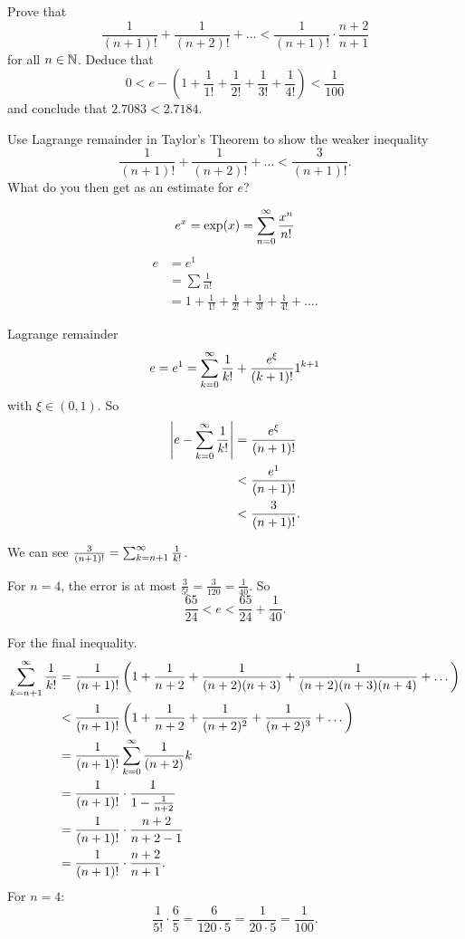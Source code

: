 \documentclass[10pt, a4paper]{article}
\begin{document}
\begin{problem}[6]
    Prove that
    \[
    \frac{1}{(n + 1)!} + \frac{1}{(n + 2)!} + \dotsc < \frac{1}{(n + 1)!}\cdot\frac{n + 2}{n + 1}
    \]
    for all $n \in \N$.
    Deduce that
    \[
    0 < e - \left(1 + \frac{1}{1!} + \frac{1}{2!} + \frac{1}{3!} + \frac{1}{4!}\right) < \frac{1}{100}
    \]
    and conclude that $2.7083 < 2.7184$.

    Use Lagrange remainder in Taylor's Theorem to show the weaker inequality
    \[
    \frac{1}{(n + 1)!} + \frac{1}{(n + 2)!} + \dotsc < \frac{3}{(n + 1)!}.
    \]
    What do you then get as an estimate for $e$?

    \begin{solution}
        \[
        e ^ x = \exp(x) = \infsum[n = 0]\frac{x ^ n}{n!}
        \]
        \begin{align*}
            e &= e ^ 1 \\
            &= \sum\frac{1}{n!} \\
            &= 1 + \frac{1}{1!} + \frac{1}{2!} + \frac{1}{3!} + \frac{1}{4!} + \dotsc.
        \end{align*}

        Lagrange remainder
        \[
        e = e ^ 1 = \infsumo\frac{1}{k!} + \frac{e ^ {\xi}}{(k + 1)!}1 ^ {k + 1}
        \]
        with $\xi \in (0, 1)$.
        So
        \begin{align*}
            \left|e - \infsumo\frac{1}{k!}\right| &= \frac{e ^ {\xi}}{(n + 1)!} \\
            &< \frac{e ^ 1}{(n + 1)!} \\
            &< \frac{3}{(n + 1)!}.
        \end{align*}

        We can see $\frac{3}{(n + 1)!} = \infsum[k = n + 1]\frac{1}{k!}$.

        For $n = 4$,
        the error is at most $\frac{3}{5!} = \frac{3}{120} = \frac{1}{40}$.
        So
        \[
        \frac{65}{24} < e < \frac{65}{24} + \frac{1}{40}.
        \]

        For the final inequality.
        \begin{align*}
            \infsum[k = n + 1]\frac{1}{k!} &= \frac{1}{(n + 1)!}\left(1 + \frac{1}{n + 2} + \frac{1}{(n + 2)(n + 3)} + \frac{1}{(n + 2)(n + 3)(n + 4)} + \dotsc\right) \\
            &<\frac{1}{(n + 1)!}\left(1 + \frac{1}{n + 2} + \frac{1}{(n + 2) ^ 2} + \frac{1}{(n + 2) ^ 3} + \dotsc\right) \\
            &= \frac{1}{(n + 1)!}\infsumo\frac{1}{(n + 2)}k \\
            &= \frac{1}{(n + 1)!}\cdot\frac{1}{1 - \frac{1}{n + 2}} \\
            &= \frac{1}{(n + 1)!}\cdot \frac{n + 2}{n + 2 - 1} \\
            &= \frac{1}{(n + 1)!}\cdot \frac{n + 2}{n + 1}.
        \end{align*}
        For $n = 4$:
        \[
        \frac{1}{5!}\cdot\frac{6}{5} = \frac{6}{120 \cdot 5} = \frac{1}{20 \cdot 5} = \frac{1}{100}.
        \]
    \end{solution}
\end{problem}
\end{document}
